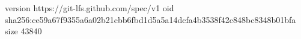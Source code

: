 version https://git-lfs.github.com/spec/v1
oid sha256:ce59a67f9355a6a02b21cbb6fbd1d5a5a14dcfa4b3538f42c848bc8348b01bfa
size 43840
